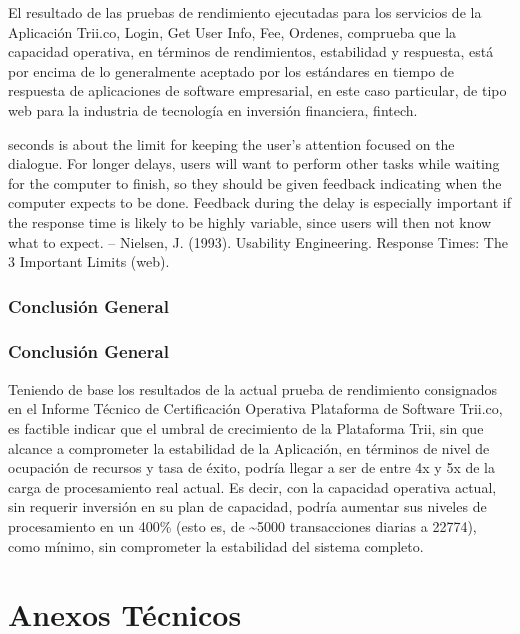 \documentclass[
  paper=a4,
  ,captions=tableheading
]{scrartcl}
\renewenvironment{quote}{\begin{customblockquote}\list{}{\rightmargin=0em\leftmargin=0em}%
\item\relax\color{blockquote-text}\ignorespaces}{\unskip\unskip\endlist\end{customblockquote}}
\begin{document}
El resultado de las pruebas de rendimiento ejecutadas para los servicios
de la Aplicación Trii.co, Login, Get User Info, Fee, Ordenes, comprueba
que la capacidad operativa, en términos de rendimientos, estabilidad y
respuesta, está por encima de lo generalmente aceptado por los
estándares en tiempo de respuesta de aplicaciones de software
empresarial, en este caso particular, de tipo web para la industria de
tecnología en inversión financiera, fintech.

\begin{quote}
10 seconds is about the limit for keeping the user's attention focused
on the dialogue. For longer delays, users will want to perform other
tasks while waiting for the computer to finish, so they should be given
feedback indicating when the computer expects to be done. Feedback
during the delay is especially important if the response time is likely
to be highly variable, since users will then not know what to expect. --
Nielsen, J. (1993). Usability Engineering. Response Times: The 3
Important Limits (web).
\end{quote}

\subsubsection{Conclusión General}\label{sec:conclusiuxf3n-general}

\subsubsection{Conclusión General}\label{sec:conclusiuxf3n-general-1}

Teniendo de base los resultados de la actual prueba de rendimiento
consignados en el Informe Técnico de Certificación Operativa Plataforma
de Software Trii.co, es factible indicar que el umbral de crecimiento de
la Plataforma Trii, sin que alcance a comprometer la estabilidad de la
Aplicación, en términos de nivel de ocupación de recursos y tasa de
éxito, podría llegar a ser de entre 4x y 5x de la carga de procesamiento
real actual. Es decir, con la capacidad operativa actual, sin requerir
inversión en su plan de capacidad, podría aumentar sus niveles de
procesamiento en un 400\% (esto es, de \textasciitilde5000 transacciones
diarias a 22774), como mínimo, sin comprometer la estabilidad del
sistema completo.

\newpage

\section{Anexos Técnicos}\label{sec:anexos-tuxe9cnicos}
\end{document}
